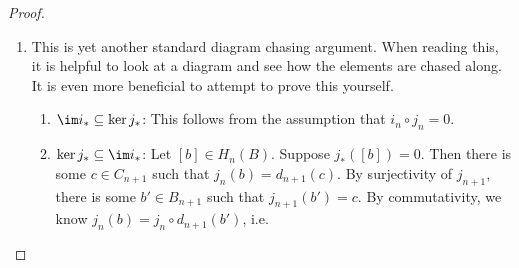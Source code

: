 \documentclass[a4paper]{article}
\begin{document}
\begin{proof}
\begin{enumerate}
\begin{enumerate}
\begin{align*}
            &= d_n \circ i_n (a) + d_n(y) \\
            &= i_{n - 1} \circ d_n (a) + d_n(y).
          \end{align*}
          Hence when we pull back $d_n(y')$ and $d_n(y)$ to $A_{n - 1}$, the results differ by the boundary $d_n(a)$, and hence produce the same homology class.
        \item Suppose $[x'] = [x]$. We want to show that $\partial_* [x] = \partial_*[x']$. This time, we add a layer above.
          \[
            \begin{tikzcd}
              0 \ar[r] & A_{n + 1} \ar[r, "i_{n + 1}"] \ar[d, "d_{n + 1}"] & B_{n + 1} \ar[r, "j_{n + 1}"] \ar[d, "d_{n + 1}"] & C_{n + 1} \ar[r] \ar[d, "d_{n + 1}"] & 0\\
              0 \ar[r] & A_n \ar[r, "i_n"] \ar[d, "d_n"] & B_n \ar[r, "j_n"] \ar[d, "d_n"] & C_n \ar[r] \ar[d, "d_n"] & 0\\
              0 \ar[r] & A_{n - 1} \ar[r, "i_{n - 1}"] & B_{n - 1} \ar[r, "j_{n - 1}"] & C_{n - 1} \ar[r] & 0
            \end{tikzcd}
          \]
          By definition, since $[x'] = [x]$, there is some $c \in C_{n + 1}$ such that
          \[
            x' = x + d_{n + 1} (c).
          \]
          By surjectivity of $j_{n + 1}$, we can write $c = j_{n + 1}(b)$ for some $b \in B_{n + 1}$. By commutativity of the squares, we know
          \[
            x' = x + j_n \circ d_{n + 1} (b).
          \]
          The next step of the proof is to find some $y$ such that $j_n (y) = x$. Then
          \[
            j_n(y + d_{n + 1} (b)) = x'.
          \]
          So the corresponding $y'$ is $y' = y + d_{n + 1}(b)$. So $d_n (y) = d_n(y')$, and hence $\partial_*[x] = \partial_* [x']$.
      \end{enumerate}
    \item This is yet another standard diagram chasing argument. When reading this, it is helpful to look at a diagram and see how the elements are chased along. It is even more beneficial to attempt to prove this yourself.
      \begin{enumerate}
        \item $\im i_* \subseteq \ker j_*$: This follows from the assumption that $i_n \circ j_n = 0$.
        \item $\ker j_* \subseteq \im i_*$: Let $[b] \in H_n(B)$. Suppose $j_*([b]) = 0$. Then there is some $c \in C_{n + 1}$ such that $j_n(b) = d_{n + 1}(c)$. By surjectivity of $j_{n + 1}$, there is some $b' \in B_{n + 1}$ such that $j_{n + 1}(b') = c$. By commutativity, we know $j_n(b) = j_n \circ d_{n + 1}(b')$, i.e.

\end{enumerate}
\end{enumerate}
\end{proof}
\end{document}
